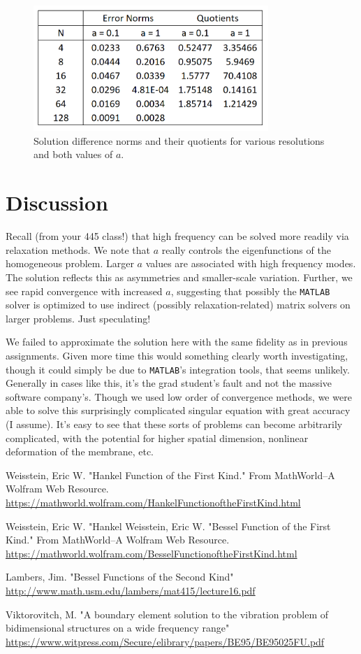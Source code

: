 \documentclass[10pt]{article}
\begin{document}
\begin{figure}[H]
    \centering
    \includegraphics[width=3.5in]{errors_tab.PNG}
    \caption{Solution difference norms and their quotients for various resolutions and both values of $a$.}
    \label{fig:tab}
\end{figure}
\vfill
\section*{Discussion}
Recall (from your 445 class!) that high frequency can be solved more readily via relaxation methods.
We note that $a$ really controls the eigenfunctions of the homogeneous problem.
Larger $a$ values are associated with high frequency modes.
The solution reflects this as asymmetries and smaller-scale variation.
Further, we see rapid convergence with increased $a$, suggesting that possibly the \texttt{MATLAB} solver is optimized to use indirect (possibly relaxation-related) matrix solvers on larger problems.
Just speculating!

We failed to approximate the solution here with the same fidelity as in previous assignments.
Given more time this would something clearly worth investigating, though it could simply be due to \texttt{MATLAB}'s integration tools, that seems unlikely.
Generally in cases like this, it's the grad student's fault and not the massive software company's.
Though we used low order of convergence methods, we were able to solve this surprisingly complicated singular equation with great accuracy (I assume).
It's easy to see that these sorts of problems can become arbitrarily complicated, with the potential for higher spatial dimension, nonlinear deformation of the membrane, etc.
\vfill


\clearpage
\begin{thebibliography}{9}
     Weisstein, Eric W. "Hankel Function of the First Kind." From MathWorld--A Wolfram Web Resource. \url{https://mathworld.wolfram.com/HankelFunctionoftheFirstKind.html}
    
     Weisstein, Eric W. "Hankel Weisstein, Eric W. "Bessel Function of the First Kind." From MathWorld--A Wolfram Web Resource. 
    \url{https://mathworld.wolfram.com/BesselFunctionoftheFirstKind.html}

     Lambers, Jim. "Bessel Functions of the Second Kind"
    \url{http://www.math.usm.edu/lambers/mat415/lecture16.pdf}

     Viktorovitch, M. "A boundary element solution to the vibration problem of bidimensional structures on a wide frequency range"
    \url{https://www.witpress.com/Secure/elibrary/papers/BE95/BE95025FU.pdf}
\end{thebibliography}
\end{document}
